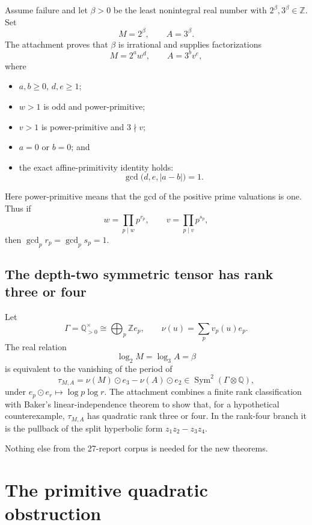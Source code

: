 \documentclass[11pt]{article}
\numberwithin{equation}{section}
\theoremstyle{definition}
\theoremstyle{remark}
\newcommand{\Q}{\mathbb Q}
\newcommand{\Z}{\mathbb Z}
\newcommand{\Sym}{\operatorname{Sym}}
\begin{document}
Assume failure and let \(\beta>0\) be the least nonintegral real number with
\(2^\beta,3^\beta\in\Z\).  Set
\[
 M=2^\beta,\qquad A=3^\beta.
\]
The attachment proves that \(\beta\) is irrational and supplies factorizations
\begin{equation}
 M=2^a w^d,\qquad A=3^b v^e,\label{eq:normalization}
\end{equation}
where
\begin{itemize}
\item \(a,b\ge0\), \(d,e\ge1\);
\item \(w>1\) is odd and power-primitive;
\item \(v>1\) is power-primitive and \(3\nmid v\);
\item \(a=0\) or \(b=0\); and
\item the exact affine-primitivity identity holds:
\begin{equation}
 \gcd\bigl(d,e,|a-b|\bigr)=1.\label{eq:gcdone}
\end{equation}
\end{itemize}
Here power-primitive means that the gcd of the positive prime valuations is one.  Thus if
\[
 w=\prod_{p\mid w}p^{r_p},\qquad v=\prod_{p\mid v}p^{s_p},
\]
then \(\gcd_p r_p=\gcd_p s_p=1\).

\subsection{The depth-two symmetric tensor has rank three or four}

Let
\[
 \Gamma=\Q_{>0}^{\times}\cong\bigoplus_p\Z e_p,
 \qquad \nu(u)=\sum_pv_p(u)e_p.
\]
The real relation
\[
 \log_2 M=\log_3 A=\beta
\]
is equivalent to the vanishing of the period of
\begin{equation}
 \tau_{M,A}=\nu(M)\odot e_3-\nu(A)\odot e_2
 \in\Sym^2(\Gamma\otimes\Q),\label{eq:symtensor}
\end{equation}
under \(e_p\odot e_r\mapsto\log p\log r\).  The attachment combines a finite rank
classification with Baker's linear-independence theorem \cite{Baker1966} to show that, for a hypothetical
counterexample, \(\tau_{M,A}\) has quadratic rank three or four.  In the rank-four branch it
is the pullback of the split hyperbolic form \(z_1z_2-z_3z_4\).

Nothing else from the 27-report corpus is needed for the new theorems.

\section{The primitive quadratic obstruction}
\label{sec:primitiveQ}
\end{document}
